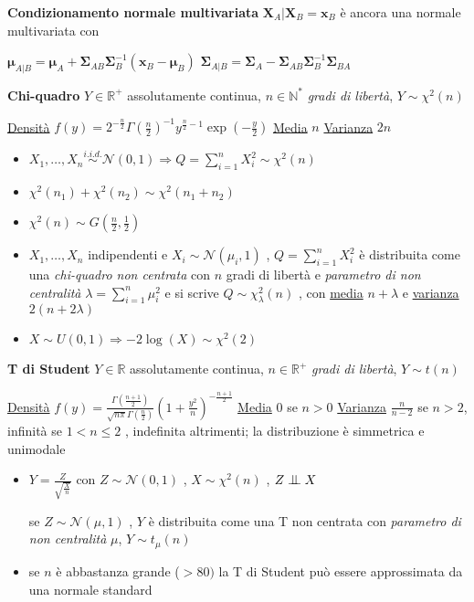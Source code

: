 \documentclass[openany]{book} %
\newcommand{\ind}{\mathrel{\text{\scalebox{1.07}{$\perp\mkern-10mu\perp$}}}}
\begin{document}
\textbf{Condizionamento normale multivariata} $\boldsymbol{X}_A|\boldsymbol{X}_B=\boldsymbol{x}_B$ è ancora una normale multivariata con 

$\boldsymbol{\mu}_{A|B} = \boldsymbol{\mu}_A+\boldsymbol{\Sigma}_{AB}\boldsymbol{\Sigma}^{-1}_B(\boldsymbol{x}_B-\boldsymbol{\mu}_B)$ \quad $\boldsymbol{\Sigma}_{A|B} = \boldsymbol{\Sigma}_{A}-\boldsymbol{\Sigma}_{AB}\boldsymbol{\Sigma}^{-1}_B\boldsymbol{\Sigma}_{BA}$

\textbf{Chi-quadro} $Y \in \mathbb{R}^+$ assolutamente continua, $n\in \mathbb{N}^*$ \textit{gradi di libertà}, $Y\sim\chi^2(n)$

\underline{Densità} $f(y)=2^{-\frac{n}{2}}\Gamma(\frac{n}{2})^{-1}y^{\frac{n}{2}-1}\exp(-\frac{y}{2})$ \qquad \underline{Media} $n$ \qquad \underline{Varianza} $2n$

\begin{itemize}

\item $X_1,\dots,X_n \overset{i.i.d.}{\sim}\mathcal{N}(0,1)\Rightarrow Q=\sum_{i=1}^nX_i^2\sim\chi^2(n)$

\item $\chi^2(n_1)+\chi^2(n_2)\sim\chi^2(n_1+n_2)$

\item $\chi^2(n)\sim G(\frac{n}{2},\frac{1}{2})$

\item $X_1,\dots,X_n$ indipendenti e $X_i\sim\mathcal{N}(\mu_i,1)$ , $Q=\sum_{i=1}^nX_i^2$ è distribuita come una \textit{chi-quadro non centrata} con $n$ gradi di libertà e \textit{parametro di non centralità} $\lambda=\sum_{i=1}^n\mu_i^2$ e si scrive $Q\sim\chi^2_\lambda(n)$ , con \underline{media} $n+\lambda$ e \underline{varianza} $2(n+2\lambda)$

\item $X\sim U(0,1)\Rightarrow-2\log(X)\sim\chi^2(2)$

\end{itemize}

\textbf{T di Student} $Y\in \mathbb{R}$ assolutamente continua, $n\in \mathbb{R}^+$ \textit{gradi di libertà}, $Y\sim t(n)$

\underline{Densità} $f(y)=\frac{\Gamma(\frac{n+1}{2})}{\sqrt{n\pi}\Gamma(\frac{n}{2})}(1+\frac{y^2}{n})^{-\frac{n+1}{2}}$ \qquad \underline{Media} 0 se $n>0$ \qquad \underline{Varianza} $\frac{n}{n-2}$ se $n>2$, infinità se $1<n\leq2$ , indefinita altrimenti; la distribuzione è simmetrica e unimodale

\begin{itemize}

\item $Y= \frac{Z}{\sqrt{\frac{X}{n}}}$ con $Z\sim \mathcal{N}(0,1)$ , $X\sim\chi^2(n)$ , $Z\ind X$

se $Z\sim \mathcal{N}(\mu,1)$ , $Y$ è distribuita come una T non centrata con \textit{parametro di non centralità} $\mu$, $Y\sim t_\mu(n)$

\item se $n$ è abbastanza grande ($>80)$ la T di Student può essere approssimata da una normale standard

\end{itemize}
\end{document}
